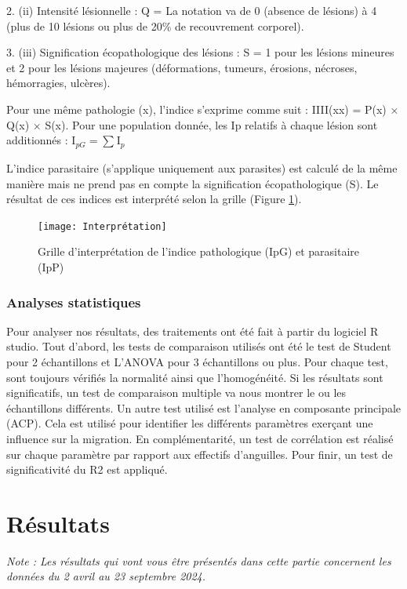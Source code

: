 \documentclass[11pt,titlepage,twoside]{article}\usepackage[]{graphicx}\usepackage[table]{xcolor}
\begin{document}
2.	(ii)  Intensité lésionnelle : Q = La notation va de 0 (absence de lésions) à 4 (plus de 10 lésions ou plus de 20\% de recouvrement corporel). 

3.	(iii) Signification écopathologique des lésions : S = 1 pour les lésions mineures et 2 pour les lésions majeures (déformations, tumeurs, érosions, nécroses, hémorragies, ulcères). 

Pour une même pathologie (x), l’indice s’exprime comme suit : IIII(xx) = P(x) × Q(x) × S(x). Pour une population donnée, les Ip relatifs à chaque lésion sont additionnés : $ \mathrm{I}_{pG}^{} = \sum_{}^{}\mathrm{I}_{p}^{} $


L’indice parasitaire (s’applique uniquement aux parasites) est calculé de la même manière mais ne prend pas en compte la signification écopathologique (S). Le résultat de ces indices est interprété selon la grille (Figure \ref{Interprétation}).

\begin{figure}[htpb]
\centering
\texttt{[image: Interprétation]}
\caption{Grille d'interprétation de l'indice pathologique (IpG) et parasitaire (IpP) \citep{elie_sante_2014}}
\label{Interprétation}
\end{figure}

\subsubsection{Analyses statistiques}
	
Pour analyser nos résultats, des traitements ont été fait à partir du logiciel R studio.
Tout d’abord, les tests de comparaison utilisés ont été le test de Student pour 2 échantillons et L’ANOVA pour 3 échantillons ou plus. Pour chaque test, sont toujours vérifiés la normalité ainsi que l’homogénéité. Si les résultats sont significatifs, un test de comparaison multiple va nous montrer le ou les échantillons différents.
Un autre test utilisé est l’analyse en composante principale (ACP). Cela est utilisé pour identifier les différents paramètres exerçant une influence sur la migration. En complémentarité, un test de corrélation est réalisé sur chaque paramètre par rapport aux effectifs d’anguilles. Pour finir, un test de significativité du R2 est appliqué.


\section{Résultats}

\textit{Note : Les résultats qui vont vous être présentés dans cette partie concernent les données du 2 avril au 23 septembre 2024.}
\end{document}
